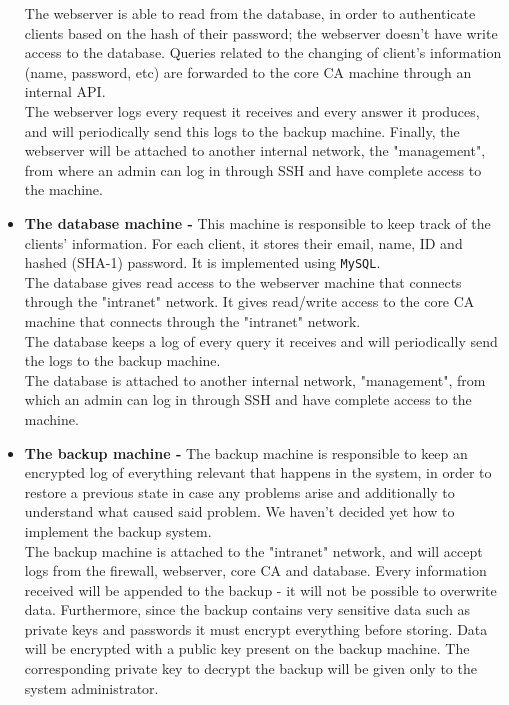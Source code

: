 \documentclass[english]{article}
\begin{document}
\begin{itemize}
		The webserver is able to read from the database, in order to authenticate clients based on the hash of their password; the webserver doesn't have write access to the database. Queries related to the changing of client's information (name, password, etc) are forwarded to the core CA machine through an internal API. \\
		The webserver logs every request it receives and every answer it produces, and will periodically send this logs to the backup machine.
		Finally, the webserver will be attached to another internal network, the "management", from where an admin can log in through SSH and have complete access to the machine.
	\item \textbf{The database machine -} This machine is responsible to keep track of the clients' information. For each client, it stores their email, name, ID and hashed (SHA-1) password. It is implemented using \texttt{MySQL}. \\
		The database gives read access to the webserver machine that connects through the "intranet" network. It gives read/write access to the core CA machine that connects through the "intranet" network. \\
		The database keeps a log of every query it receives and will periodically send the logs to the backup machine. \\
		The database is attached to another internal network, "management", from which an admin can log in through SSH and have complete access to the machine.
	\item \textbf{The backup machine -} The backup machine is responsible to keep an encrypted log of everything relevant that happens in the system, in order to restore a previous state in case any problems arise and additionally to understand what caused said problem. We haven't decided yet how to implement the backup system. \\
		The backup machine is attached to the "intranet"  network, and will accept logs from the firewall, webserver, core CA and database. Every information received will be appended to the backup - it will not be possible to overwrite data. Furthermore, since the backup contains very sensitive data such as private keys and passwords it must encrypt everything before storing. Data will be encrypted with a public key present on the backup machine. The corresponding private key to decrypt the backup will be given only to the system administrator.\\

\end{itemize}
\end{document}
